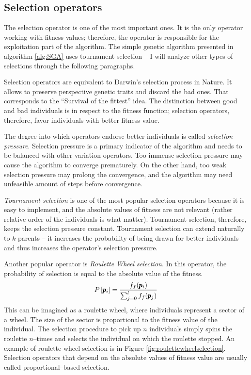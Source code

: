 \subsection{Selection operators}

The selection operator is one of the most important ones. It is the only operator working with fitness values; therefore, the operator is responsible for the exploitation part of the algorithm. The simple genetic algorithm presented in algorithm \ref{alg:SGA} uses tournament selection -- I will analyze other types of selections through the following paragraphs.

Selection operators are equivalent to Darwin's selection process in Nature. It allows to preserve perspective genetic traits and discard the bad ones. That corresponds to the \enquote{Survival of the fittest} idea. The distinction between good and bad individuals is in respect to the fitness function; selection operators, therefore, favor individuals with better fitness value.

The degree into which operators endorse better individuals is called \emph{selection pressure}. Selection pressure is a primary indicator of the algorithm and needs to be balanced with other variation operators. Too immense selection pressure may cause the algorithm to converge prematurely. On the other hand, too weak selection pressure may prolong the convergence, and the algorithm may need unfeasible amount of steps before convergence.

\emph{Tournament selection} is one of the most popular selection operators because it is easy to implement, and the absolute values of fitness are not relevant (rather relative order of the individuals is what matter). Tournament selection, therefore, keeps the selection pressure constant. Tournament selection can extend naturally to $k$ parents -- it increases the probability of being drawn for better individuals and thus increases the operator's selection pressure.

Another popular operator is \emph{Roulette Wheel selection}. In this operator, the probability of selection is equal to the absolute value of the fitness.
$$ P\left[\pmb{p}_i\right] = \frac{f_f(\pmb{p}_i)}{\sum_{j=0}^{l}f_f(\pmb{p}_j)} $$
This can be imagined as a roulette wheel, where individuals represent a sector of a wheel. The size of the sector is proportional to the fitness value of the individual. The selection procedure to pick up $n$ individuals simply spins the roulette $n$--times and selects the individual on which the roulette stopped. An example of roulette wheel selection is in Figure \ref{fig:roulettewheelselection}. Selection operators that depend on the absolute values of fitness value are usually called proportional--based selection.

